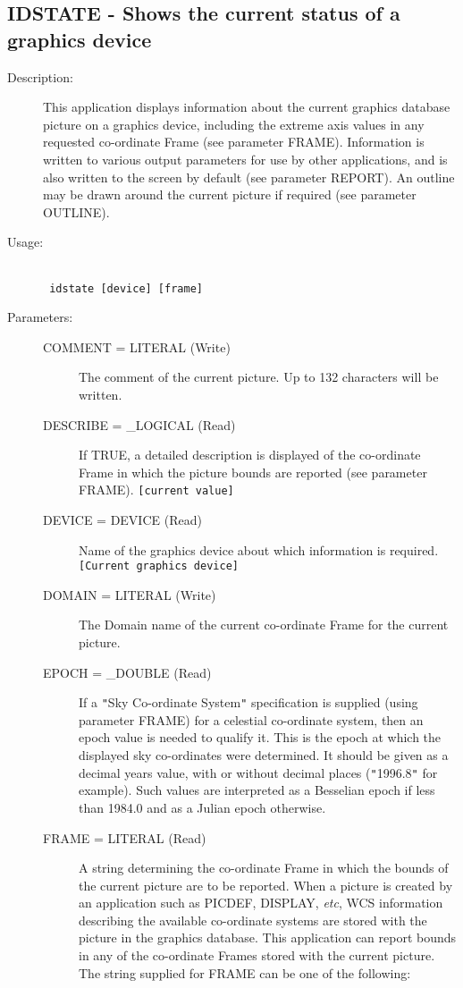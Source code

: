 \documentclass[twoside,11pt]{article}
\newcommand{\stardocinitials}  {SUN}
\newcommand{\stardocnumber}    {239.2}
\newcommand{\stardocname}{\stardocinitials /\stardocnumber}
\newcommand{\htmlref}[2]{#1}
\newcommand{\xlabel}[1]{}
\newlength{\sstbannerlength}
\newlength{\sstcaptionlength}
\newlength{\sstexampleslength}
\newlength{\sstexampleswidth}
\newcommand{\sstroutine}[3]{
   \goodbreak
   \markboth{{\stardocname}~ --- #1}{{\stardocname}~ --- #1}
   \rule{\textwidth}{0.5mm}
   \vspace{-7ex}
   \newline
   \settowidth{\sstbannerlength}{{\Large {\bf #1}}}
   \setlength{\sstcaptionlength}{\textwidth}
   \setlength{\sstexampleslength}{\textwidth}
   \addtolength{\sstbannerlength}{0.5em}
   \addtolength{\sstcaptionlength}{-2.0\sstbannerlength}
   \addtolength{\sstcaptionlength}{-4.9pt}
   \settowidth{\sstexampleswidth}{{\bf Examples:}}
   \addtolength{\sstexampleslength}{-\sstexampleswidth}
   \parbox[t]{\sstbannerlength}{\flushleft{\Large {\bf #1}}}
   \parbox[t]{\sstcaptionlength}{\center{\Large #2}}
   \parbox[t]{\sstbannerlength}{\flushright{\Large {\bf #1}}}
   \begin{description}
      #3
   \end{description}
}
\newcommand{\sstdescription}[1]{\item[Description:] #1}
\newcommand{\sstusage}[1]{\pagebreak[3] \item[Usage:] \mbox{} \\[1.3ex] {\ssttt #1}}
\newcommand{\sstparameters}[1]{
   \goodbreak 
   \item[Parameters:] \mbox{} \\
   \vspace{-3.5ex}
   \begin{description}
      #1
   \end{description}
}
\newcommand{\sstsubsection}[1]{ \item[{#1}] \mbox{} \\}
\newcommand{\ssttt}{\tt}
\renewcommand{\sstroutine}[3]{
      \subsection{#1\xlabel{#1}-\label{#1}#2}
      \begin{description}
         #3
      \end{description}
   }
\renewcommand{\sstdescription}[1]{\item[Description:]
      \begin{description}
         #1
      \end{description}
   }
\renewcommand{\sstusage}[1]{\htmlref{\item[Usage:]}{ap:usage} \mbox{} \\ {\ssttt #1}}
\renewcommand{\sstparameters}[1]{
      \htmlref{\item[Parameters:]}{se:param}
      \begin{description}
         #1
      \end{description}
   }
\renewcommand{\sstsubsection}[1]{\item[{#1}]}
\begin{document}
\sstroutine{
   IDSTATE
}{
   Shows the current status of a graphics device
}{
   \sstdescription{
      This application displays information about the current graphics
      database picture on a graphics device, including the extreme axis
      values in any requested co-ordinate Frame (see parameter FRAME).
      Information is written to various output parameters for use by
      other applications, and is also written to the screen by default
      (see parameter REPORT). An outline may be drawn around the current
      picture if required (see parameter OUTLINE).
   }
   \sstusage{
      idstate [device] [frame]
   }
   \sstparameters{
      \sstsubsection{
         COMMENT = LITERAL (Write)
      }{
         The comment of the current picture.  Up to 132 characters
         will be written.
      }
      \sstsubsection{
         DESCRIBE = \_LOGICAL (Read)
      }{
         If TRUE, a detailed description is displayed of the co-ordinate
         Frame in which the picture bounds are reported (see parameter
         FRAME). {\tt [current value]}
      }
      \sstsubsection{
         DEVICE = DEVICE (Read)
      }{
         Name of the graphics device about which information is
         required. {\tt [Current graphics device]}
      }
      \sstsubsection{
         DOMAIN = LITERAL (Write)
      }{
         The Domain name of the current co-ordinate Frame for the current
         picture.
      }
      \sstsubsection{
         EPOCH = \_DOUBLE (Read)
      }{
         If a {\tt "}Sky Co-ordinate System{\tt "} specification is supplied (using
         parameter FRAME) for a celestial co-ordinate system, then an
         epoch value is needed to qualify it. This is the epoch at
         which the displayed sky co-ordinates were determined. It should
         be given as a decimal years value, with or without decimal places
         ({\tt "}1996.8{\tt "} for example). Such values are interpreted as a Besselian
         epoch if less than 1984.0 and as a Julian epoch otherwise.
      }
      \sstsubsection{
         FRAME = LITERAL (Read)
      }{
         A string determining the co-ordinate Frame in which the bounds
         of the current picture are to be reported. When a picture is
         created by an application such as PICDEF, DISPLAY, \emph{etc}, WCS
         information describing the available co-ordinate systems are stored
         with the picture in the graphics database. This application can
         report bounds in any of the co-ordinate Frames stored with the
         current picture. The string supplied for FRAME can be one of the
         following:

}}}
\end{document}

